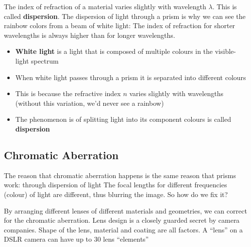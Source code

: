 The index of refraction of a material varies slightly with wavelength
$\lambda$. This is called \textbf{dispersion}. The dispersion of light through
a prism is why we can see the rainbow colors from a beam of white light:
The index of refraction for shorter wavelengths is always higher than for
longer wavelengths.

\begin{itemize}
\item\textbf{White light} is a light that is composed of multiple colours
  in the visible-light spectrum
\item When white light passes through a prism it is separated into
  different colours
\item This is because the refractive index $n$ varies slightly with
  wavelengths (without this variation, we'd never see a rainbow)
\item The phenomenon is of splitting light into its component colours is
  called \textbf{dispersion}
\end{itemize}
%
%



\subsection{Chromatic Aberration}
The reason that chromatic aberration happens is the same reason that prisms
work: through dispersion of light
The focal lengths for different frequencies (colour) of light are different,
thus blurring the image. So how do we fix it?

By arranging different lenses of different materials and geometries, we can
correct for the chromatic aberration.
Lens design is a closely guarded secret by camera companies. Shape of the
lens, material and coating are all factors. A ``lens'' on a DSLR camera can
have up to 30 lens ``elements''






